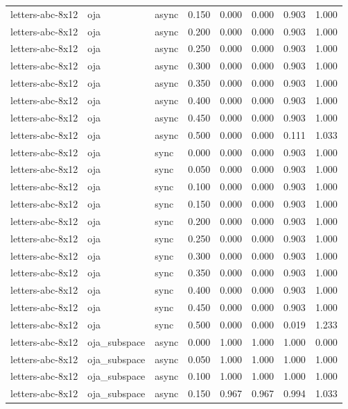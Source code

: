 \begin{tabular}{lllrrrrr}
letters-abc-8x12 & oja & async & 0.150 & 0.000 & 0.000 & 0.903 & 1.000 \\
letters-abc-8x12 & oja & async & 0.200 & 0.000 & 0.000 & 0.903 & 1.000 \\
letters-abc-8x12 & oja & async & 0.250 & 0.000 & 0.000 & 0.903 & 1.000 \\
letters-abc-8x12 & oja & async & 0.300 & 0.000 & 0.000 & 0.903 & 1.000 \\
letters-abc-8x12 & oja & async & 0.350 & 0.000 & 0.000 & 0.903 & 1.000 \\
letters-abc-8x12 & oja & async & 0.400 & 0.000 & 0.000 & 0.903 & 1.000 \\
letters-abc-8x12 & oja & async & 0.450 & 0.000 & 0.000 & 0.903 & 1.000 \\
letters-abc-8x12 & oja & async & 0.500 & 0.000 & 0.000 & 0.111 & 1.033 \\
letters-abc-8x12 & oja & sync & 0.000 & 0.000 & 0.000 & 0.903 & 1.000 \\
letters-abc-8x12 & oja & sync & 0.050 & 0.000 & 0.000 & 0.903 & 1.000 \\
letters-abc-8x12 & oja & sync & 0.100 & 0.000 & 0.000 & 0.903 & 1.000 \\
letters-abc-8x12 & oja & sync & 0.150 & 0.000 & 0.000 & 0.903 & 1.000 \\
letters-abc-8x12 & oja & sync & 0.200 & 0.000 & 0.000 & 0.903 & 1.000 \\
letters-abc-8x12 & oja & sync & 0.250 & 0.000 & 0.000 & 0.903 & 1.000 \\
letters-abc-8x12 & oja & sync & 0.300 & 0.000 & 0.000 & 0.903 & 1.000 \\
letters-abc-8x12 & oja & sync & 0.350 & 0.000 & 0.000 & 0.903 & 1.000 \\
letters-abc-8x12 & oja & sync & 0.400 & 0.000 & 0.000 & 0.903 & 1.000 \\
letters-abc-8x12 & oja & sync & 0.450 & 0.000 & 0.000 & 0.903 & 1.000 \\
letters-abc-8x12 & oja & sync & 0.500 & 0.000 & 0.000 & 0.019 & 1.233 \\
letters-abc-8x12 & oja\_subspace & async & 0.000 & 1.000 & 1.000 & 1.000 & 0.000 \\
letters-abc-8x12 & oja\_subspace & async & 0.050 & 1.000 & 1.000 & 1.000 & 1.000 \\
letters-abc-8x12 & oja\_subspace & async & 0.100 & 1.000 & 1.000 & 1.000 & 1.000 \\
letters-abc-8x12 & oja\_subspace & async & 0.150 & 0.967 & 0.967 & 0.994 & 1.033 \\

\end{tabular}
